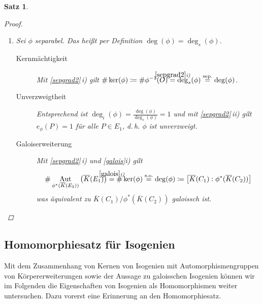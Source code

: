 \documentclass[english, german, parskip=half]{scrartcl}
\newtheorem{Satz}{Satz}[section]
\theoremstyle{definition}
\theoremstyle{remark}
\newcommand*{\algK}{\ensuremath{\overline K}} %
\newcommand*{\degs}{\operatorname{\deg}_s} %
\newcommand*{\degi}{\operatorname{\deg}_i} %
\DeclareMathOperator{\Aut}{Aut} %
\begin{document}
\begin{Satz}
\begin{proof}
\begin{enumerate}[label=\roman*)]
\begin{description}
          $T$ und $O$ übereinstimmen müssen. Damit muss $T=O$ sein.
        \end{description}
    \item Sei $\phi$ separabel. Das heißt per Definition
      $\deg(\phi)=\degs(\phi)$.
      \begin{description}
        \item[Kernmächtigkeit]
          Mit \autoref{sepgrad2}\,\emph{i)} gilt
          $
          \#\ker(\phi)
          \coloneqq \#\phi^{-1}(O)
          \overset{\mathclap{\autoref{sepgrad2}\emph{i)}}}{=} \degs(\phi)
          \overset{{\text{sep.}}}{=} \deg(\phi)
          $.
        \item[Unverzweigtheit] 
          Entsprechend ist
          $\degi(\phi)=\frac{\deg(\phi)}{\degs(\phi)}=1$
          und mit \autoref{sepgrad2}\,\emph{ii)} gilt
          $e_\phi(P)=1$ für alle $P\in E_1$, d.\,h. $\phi$
          ist unverzweigt.
        \item[Galoiserweiterung]
          Mit \autoref{sepgrad2}\,\emph{i)} und \autoref{galois}\emph{i)} gilt
          \begin{align*}
            \#\Aut_{\phi^*(\algK(E_2))}\left( \algK(E_1) \right) 
            \overset{\mathclap{\autoref{galois}\emph{i)}}}{=}
              \#\ker(\phi)
            \overset{{\text{s.o.}}}{=} \deg(\phi)
            \coloneqq \left[\algK(C_1):\phi^*(\algK(C_2))\right]
          \end{align*}
          was äquivalent zu
          $\algK(C_1)/\phi^*(\algK(C_2))$ galoissch ist.
        \end{description}
      \end{enumerate}
\end{proof}
\end{Satz}

\subsection{Homomorphiesatz für Isogenien}
Mit dem Zusammenhang von Kernen von Isogenien mit
Automorphismengruppen von Körpererweiterungen sowie der Aussage zu
galoisschen Isogenien können wir im Folgenden die Eigenschaften von
Isogenien als Homomorphismen weiter untersuchen.
Dazu vorerst eine Erinnerung an den Homomorphiesatz.
\end{document}

